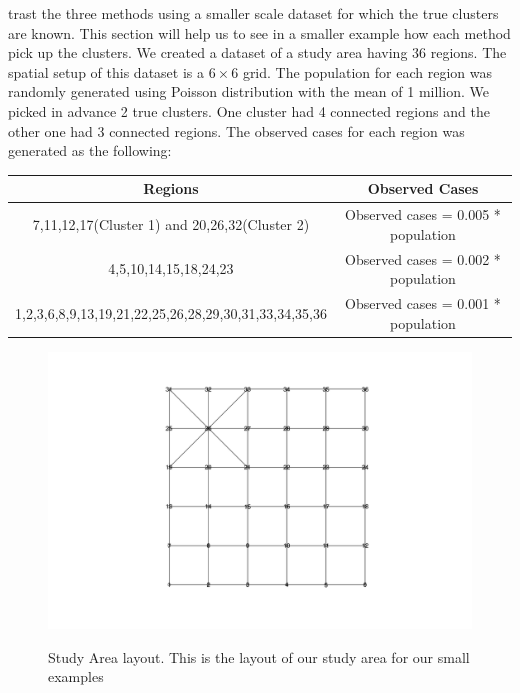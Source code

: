 \documentclass[12pt]{article}
\begin{document}
\begin{enumerate}
trast the three methods using a smaller scale dataset for which the true clusters are known. This section will help us to see in a smaller example how each method pick up the clusters. We created a dataset of a study area having 36 regions. The spatial setup of this dataset is a $6\times6$ grid. The population for each region was randomly generated using Poisson distribution with the mean of 1 million. We picked in advance 2 true clusters. One cluster had 4 connected regions and the other one had 3 connected regions. The observed cases for each region was generated as the following: \\
		
	\begin{tabular}{|c|c|}
	\hline
	Regions & Observed Cases \\
	\hline
	7,11,12,17(Cluster 1) and 20,26,32(Cluster 2) & Observed cases = 0.005 * population \\ 
	4,5,10,14,15,18,24,23 & Observed cases = 0.002 * population \\
	1,2,3,6,8,9,13,19,21,22,25,26,28,29,30,31,33,34,35,36 & Observed cases = 0.001 * population \\
	\hline
	\end{tabular}	
	
	\end{enumerate} 
	\begin{figure}[!ht]
		
		\centering
		\includegraphics[scale=0.2]{Area_layout}\\
		\caption{Study Area layout. This is the layout of our study area for our small examples\label{f:gull}}
		
	\end{figure}
	
\end{document}
